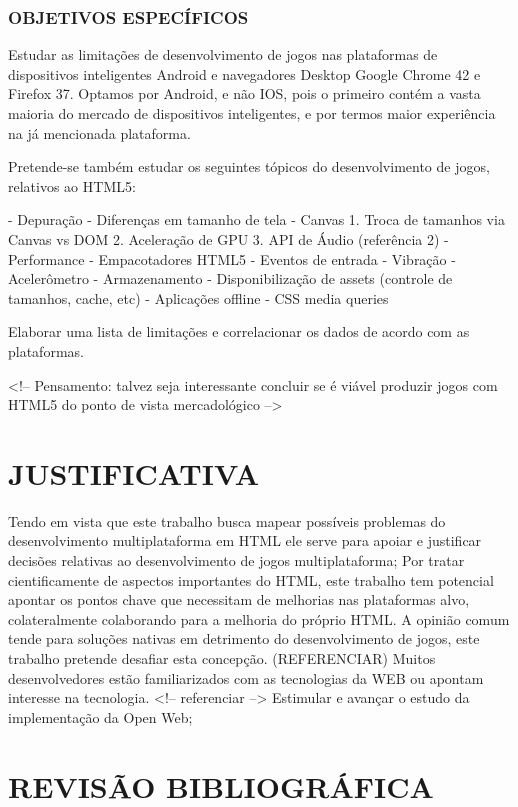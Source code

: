 \documentclass[11pt,a4paper]{article}
\begin{document}
\subsubsection{  OBJETIVOS ESPECÍFICOS}

Estudar as limitações de desenvolvimento de jogos nas plataformas de
dispositivos inteligentes Android e navegadores Desktop Google Chrome 42
e Firefox 37. Optamos por Android, e não IOS, pois o primeiro contém
a vasta maioria do mercado de dispositivos inteligentes, e por termos
maior experiência na já mencionada plataforma.

Pretende-se também estudar os seguintes tópicos do desenvolvimento de
jogos, relativos ao HTML5:

- Depuração
- Diferenças em tamanho de tela
- Canvas
1. Troca de tamanhos via Canvas vs DOM
2. Aceleração de GPU
3. API de Áudio (referência 2)
- Performance
- Empacotadores HTML5
- Eventos de entrada
- Vibração
- Acelerômetro
- Armazenamento
- Disponibilização de assets (controle de tamanhos, cache, etc)
- Aplicações offline
- CSS media queries

Elaborar uma lista de limitações e correlacionar os dados de acordo
com as plataformas.

<!-- Pensamento: talvez seja interessante concluir se é viável
produzir jogos com HTML5 do ponto de vista mercadológico --> %

\section{JUSTIFICATIVA}

Tendo em vista que este trabalho busca mapear possíveis problemas
do desenvolvimento multiplataforma em HTML ele serve para apoiar
e justificar decisões relativas ao desenvolvimento de jogos
multiplataforma; Por tratar cientificamente de aspectos importantes do
HTML, este trabalho tem potencial apontar os pontos chave que necessitam
de melhorias nas plataformas alvo, colateralmente colaborando para a
melhoria do próprio HTML.
A opinião comum tende para soluções nativas em detrimento do
desenvolvimento de jogos, este trabalho pretende desafiar esta
concepção. (REFERENCIAR) Muitos desenvolvedores estão familiarizados
com as tecnologias da WEB ou apontam interesse na tecnologia. <!--
referenciar -->
Estimular e avançar o estudo da implementação da Open Web;

\section{REVISÃO BIBLIOGRÁFICA}
\end{document}

